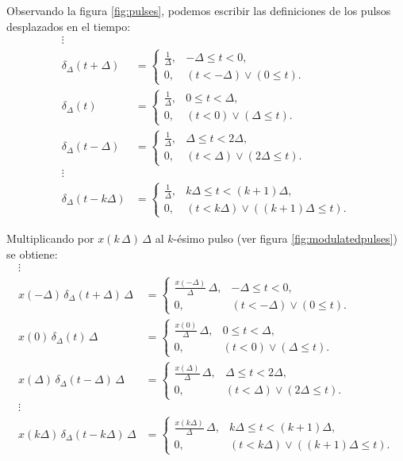 Observando la figura \ref{fig:pulses}, podemos escribir las definiciones de los pulsos desplazados en el tiempo:
\begin{align}
	\vdots \nonumber \\ 
	\delta_{\Delta}(t+\Delta) &= \begin{cases}
		\frac{1}{\Delta}, & -\Delta \leq t < 0, \\ 
		0, & (t < -\Delta) \lor (0 \leq t).
	\end{cases} \\ 
	\delta_{\Delta}(t) &= \begin{cases}
		\frac{1}{\Delta}, & 0 \leq t < \Delta, \\ 
		0, & (t < 0) \lor (\Delta \leq t).
	\end{cases} \\ 
	\delta_{\Delta}(t-\Delta) &= \begin{cases}
		\frac{1}{\Delta}, & \Delta \leq t < 2\Delta, \\ 
		0, & (t < \Delta) \lor (2\Delta \leq t).
	\end{cases} \\ 
	\vdots \nonumber \\ 
	\delta_{\Delta}(t-k\Delta) &= \begin{cases}
		\frac{1}{\Delta}, & k\Delta \leq t < (k+1)\Delta, \\ 
		0, & (t < k\Delta) \lor ((k+1)\Delta \leq t).
	\end{cases}
\end{align}

Multiplicando por $x(k \, \Delta) \, \Delta$ al $k$-ésimo pulso (ver figura \ref{fig:modulatedpulses}) se obtiene:
\begin{align}
	\vdots \nonumber \\ 
	x(-\Delta) \, \delta_{\Delta}(t+\Delta) \, \Delta &= \begin{cases}
		\frac{x(-\Delta)}{\Delta} \, \Delta, & -\Delta \leq t < 0, \\ 
		0, & (t < -\Delta) \lor (0 \leq t).
	\end{cases} \\ 
	x(0) \, \delta_{\Delta}(t) \, \Delta &= \begin{cases}
		\frac{x(0)}{\Delta} \, \Delta, & 0 \leq t < \Delta, \\ 
		0, & (t < 0) \lor (\Delta \leq t).
	\end{cases} \\ 
	x(\Delta) \, \delta_{\Delta}(t-\Delta) \, \Delta &= \begin{cases}
		\frac{x(\Delta)}{\Delta} \, \Delta, & \Delta \leq t < 2\Delta, \\ 
		0, & (t < \Delta) \lor (2\Delta \leq t).
	\end{cases} \\ 
	\vdots \nonumber \\ 
	x(k\Delta) \, \delta_{\Delta}(t-k\Delta) \, \Delta &= \begin{cases}
		\frac{x(k\Delta)}{\Delta} \, \Delta, & k\Delta \leq t < (k+1)\Delta, \\ 
		0, & (t < k\Delta) \lor ((k+1)\Delta \leq t).
	\end{cases}
\end{align}

